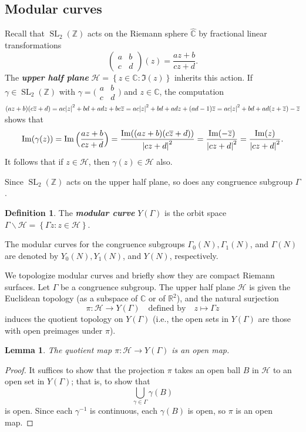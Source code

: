 \documentclass[10pt,leqno,twoside]{article}
\theoremstyle{plain}
\newtheorem{lemma}[lem]{Lemma}
\theoremstyle{definition}
\newtheorem{definition/}[lem]{Definition}
\newenvironment{definition}
  {\renewcommand{\qedsymbol}{\textdagger}%
   \pushQED{\qed}\begin{definition/}}
  {\popQED\end{definition/}}
\numberwithin{equation}{section}
\numberwithin{lem}{section}
\newcommand{\cbr}[1]{\left\{#1\right\}}
\newcommand{\textib}[1]{\textbf{\textit{#1\index{#1}}}} %
\DeclareMathOperator{\SL}{SL}
\newcommand{\smallabcd}{\big(\!\begin{smallmatrix}
    a & b \\ c & d
\end{smallmatrix}\!\big)}
\newcommand{\abcd}{\begin{pmatrix}
    a & b \\ c & d
\end{pmatrix}}
\newcommand{\slz}{\SL_2(\mathbb{Z})}
\begin{document}
\subsection{Modular curves}
Recall that $\slz$ acts on the Riemann sphere $\widehat{\mathbb{C}}$ by fractional linear transformations \[\abcd(z) = \frac{az + b}{cz+d}.\] The \textib{upper half plane} $\mathcal{H} = \cbr{z\in\mathbb{C} : \Im(z)}$ inherits this action. If $\gamma\in \slz$ with $\gamma = \smallabcd$ and $z\in \mathbb C$, the computation $(az+b)(c\overline z + d) = ac\abs{z}^2+bd + adz + bc\overline z = ac\abs{z}^2+bd + adz + (ad-1)\overline z = ac\abs{z}^2+bd + ad(z+\overline z) -\overline z$ shows that
\begin{equation}\label{eq: imaginary parts}
    \Im(\gamma(z)) = \Im\Big(\frac{az+b}{cz+d}\Big) = \frac{\Im((az+b)(c\overline z + d))}{\abs{cz+d}^2} = \frac{\Im(-\overline z)}{\abs{cz+d}^2} = \frac{\Im(z)}{\abs{cz+d}^2}.
\end{equation}
It follows that if $z\in \mathcal{H}$, then $\gamma(z)\in \mathcal{H}$ also.

Since $\slz$ acts on the upper half plane, so does any congruence subgroup $\varGamma$. 
\begin{definition}
    The \textib{modular curve} $Y(\varGamma)$ is the orbit space $\varGamma\backslash \mathcal{H} = \cbr{\varGamma z : z\in\mathcal H}$.
\end{definition}
The modular curves for the congruence subgroups $\varGamma_0(N), \varGamma_1(N)$, and $\varGamma(N)$ are denoted by $Y_0(N), Y_1(N)$, and $Y(N)$, respectively.

We topologize modular curves and briefly show they are compact Riemann surfaces. Let $\varGamma$ be a congruence subgroup. The upper half plane $\mathcal H$ is given the Euclidean topology (as a subspace of $\mathbb{C}$ or of $\mathbb{R}^2$), and the natural surjection \[\pi \colon \mathcal H \to Y(\varGamma)\quad \text{defined by}\quad  z\mapsto \varGamma z\] induces the quotient topology on $Y(\varGamma)$ (i.e., the open sets in $Y(\varGamma)$ are those with open preimages under $\pi$).

\begin{lemma}\label{lem: slz acts as open maps}
    The quotient map $\pi \colon \mathcal H \to Y(\varGamma)$ is an open map.
\end{lemma}
\begin{proof}
    It suffices to show that the projection $\pi$ takes an open ball $B$ in $\mathcal{H}$ to an open set in $Y(\varGamma)$; that is, to show that \[\bigcup_{\gamma\in \varGamma}\gamma(B)\] is open. Since each $\gamma^{-1}$ is continuous, each $\gamma(B)$ is open, so $\pi$ is an open map.
\end{proof}
\end{document}
